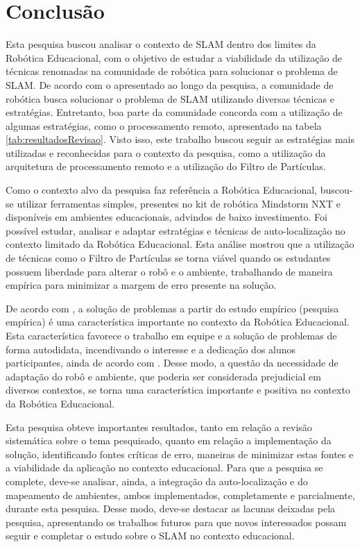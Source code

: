 \chapter[Conclusão]{Conclusão}

Esta pesquisa buscou analisar o contexto de SLAM dentro dos limites da Robótica Educacional, com o objetivo de estudar a
viabilidade da utilização de técnicas renomadas na comunidade de robótica para solucionar o problema de SLAM. De acordo com o apresentado ao
longo da pesquisa, a comunidade de robótica busca solucionar o problema de SLAM utilizando diversas
técnicas e estratégias. Entretanto, boa parte da comunidade concorda com a utilização de algumas estratégias, como o processamento remoto,
apresentado na tabela \ref{tab:resultadosRevisao}. Visto isso, este trabalho buscou seguir as estratégias mais utilizadas e reconhecidas
 para o contexto da pesquisa, como a utilização da arquitetura de processamento remoto e a utilização do Filtro de Partículas.

Como o contexto alvo da pesquisa faz referência a Robótica Educacional, buscou-se utilizar ferramentas simples,
presentes no kit de robótica Mindstorm NXT e disponíveis em ambientes educacionais, advindos de baixo investimento. Foi possível
estudar, analisar e adaptar estratégias e técnicas de auto-localização no contexto limitado da Robótica Educacional. Esta análise mostrou
que a utilização de técnicas como o Filtro de Partículas se torna viável quando os estudantes possuem liberdade para alterar o robô e o
ambiente, trabalhando de maneira empírica para minimizar a margem de erro presente na solução.

De acordo com \cite{teachingWithRoboticKit}, a solução de problemas a partir do estudo empírico (pesquisa empírica) é uma característica
importante no contexto da Robótica Educacional. Esta característica favorece o trabalho em equipe e a solução de problemas de forma autodidata,
incendivando o interesse e a dedicação dos alunos participantes, ainda de acordo com \cite{teachingWithRoboticKit}. Desse modo, a questão
da necessidade de adaptação do robô e ambiente, que poderia ser considerada prejudicial em diversos contextos, se torna uma característica
importante e positiva no contexto da Robótica Educacional.

Esta pesquisa obteve importantes resultados, tanto em relação a revisão sistemática sobre o tema pesquisado, quanto em relação
a implementação da solução, identificando fontes críticas de erro, maneiras de minimizar estas fontes e a viabilidade da aplicação
no contexto educacional. Para que a pesquisa se complete, deve-se analisar, ainda, a integração da auto-localização e do mapeamento
de ambientes, ambos implementados, completamente e parcialmente, durante esta pesquisa. Desse modo, deve-se destacar as lacunas
deixadas pela pesquisa, apresentando os trabalhos futuros para que novos interessados possam seguir e completar o estudo sobre o SLAM
no contexto educacional.

